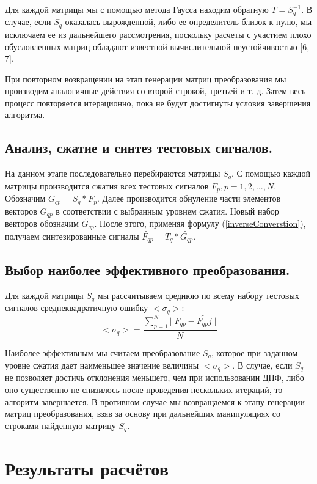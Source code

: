 \documentclass[11pt, oneside, a4paper]{article}
\begin{document}
Для каждой матрицы мы с помощью метода Гаусса находим обратную $T=S_q^{-1}$. В случае, если $S_q$ оказалась вырожденной, либо ее определитель близок к нулю, мы исключаем ее из дальнейшего рассмотрения, поскольку расчеты с участием плохо обусловленных матриц обладают известной вычислительной неустойчивостью [6, 7].

При повторном возвращении на этап генерации матриц преобразования мы производим аналогичные действия со второй строкой, третьей и т. д. Затем весь процесс повторяется итерационно, пока не будут достигнуты условия завершения алгоритма. 

\subsection{Анализ, сжатие и синтез тестовых сигналов.}

На данном этапе последовательно перебираются матрицы $S_q$. С помощью каждой матрицы производится сжатия всех тестовых сигналов $F_p, p=1,2,...,N$. Обозначим $G_{qp}=S_q*F_p$. Далее производится обнуление части элементов векторов $G_{qp}$ в соответствии с выбранным уровнем сжатия. Новый набор векторов обозначим $\tilde{G_{qp}}$. После этого, применяя формулу (\ref{inverseConverstion}), получаем синтезированные сигналы $\tilde{F_{qp}}=T_q*\tilde{G_{qp}}$.

\subsection{Выбор наиболее эффективного преобразования.}

Для каждой матрицы $S_q$ мы рассчитываем среднюю по всему набору тестовых сигналов среднеквадратичную ошибку $<\sigma_q>$:
\begin{equation}
\label{squareNormQ}
    <\sigma_q> = \frac{\sum\limits_{p=1}^{N}||F_{qp}-\tilde{F_{qp}j}||}{N}
\end{equation}

Наиболее эффективным мы считаем преобразование $S_q$, которое при заданном уровне сжатия дает наименьшее значение величины $<\sigma_q>$. В случае, если $S_q$ не позволяет достичь отклонения  меньшего, чем при использовании ДПФ, либо оно существенно не снизилось после проведения нескольких итераций, то алгоритм завершается. В противном случае мы возвращаемся к этапу генерации матриц преобразования, взяв за основу при дальнейших манипуляциях со строками найденную матрицу $S_q$.

\section{Результаты расчётов}
\end{document}
